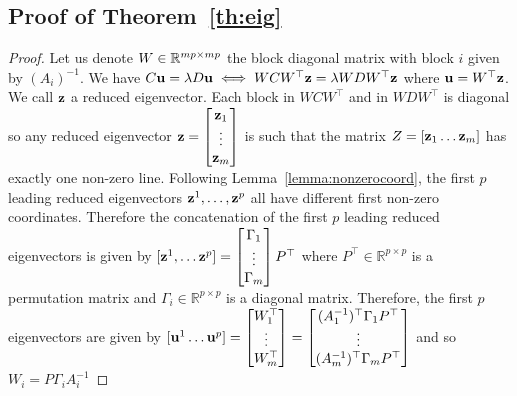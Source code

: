 \documentclass[12pt]{report}
\begin{document}
\subsection{Proof of Theorem~\ref{th:eig}}
\label{proof:eig}
\begin{proof}
  Let us denote $W \in \mathbb{R}^{mp \times mp}$ the block diagonal matrix with block $i$ given by
  $(A_i)^{-1}$. We have $C \mathbf{u} = \lambda D \mathbf{u}  \iff W C W^\top \mathbf{z} = \lambda W D W^\top \mathbf{z}
  $ where $\mathbf{u} = W^\top \mathbf{z}$. We call $\mathbf{z}$ a reduced eigenvector.
  Each
  block in $W C W^\top$ and in $W D W^\top$ is diagonal so any reduced eigenvector $\mathbf{z} = \begin{bmatrix} \mathbf{z}_1 \\ \vdots \\ \mathbf{z}_m \end{bmatrix}$ is
  such that the matrix $Z = [\mathbf{z}_1 \dots \mathbf{z}_m]$ has exactly one non-zero line.
  Following Lemma~\ref{lemma:nonzerocoord}, the first $p$ leading reduced
  eigenvectors $\mathbf{z}^1, \dots, \mathbf{z}^p$ all have different first non-zero coordinates.
  Therefore the concatenation of the first $p$ leading reduced eigenvectors is given
  by $[\mathbf{z}^1, \dots \mathbf{z}^p] = \begin{bmatrix} \Gamma_1 \\ \vdots \\ \Gamma_m \end{bmatrix} P^{\top}$ where $P^{\top} \in \mathbb{R}^{p \times p}$ is a permutation matrix and $\Gamma_i
  \in \mathbb{R}^{p \times p}$ is a diagonal matrix. Therefore, the first $p$
  eigenvectors are given by $[\mathbf{u}^1 \dots \mathbf{u}^p] = \begin{bmatrix} W_1^{\top} \\ \vdots \\ W_m^{\top} \end{bmatrix} = \begin{bmatrix} (A_1^{-1})^{\top} \Gamma_1 P^{\top} \\ \vdots \\ (A_m^{-1})^{\top} \Gamma_m P^{\top} \end{bmatrix}$  and so $W_i = P \Gamma_i A_i^{-1}$
\end{proof}
\end{document}
